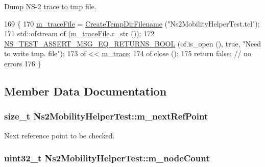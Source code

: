 Dump N\+S-\/2 trace to tmp file. 


\begin{DoxyCode}
169   \{
170     \hyperlink{classNs2MobilityHelperTest_a1bc1788ddcd0eb7ecf3e7d254afcd453}{m\_traceFile} = \hyperlink{classns3_1_1TestCase_a8a04695a6fb9ba0f89e28e9523963f88}{CreateTempDirFilename} (\textcolor{stringliteral}{"Ns2MobilityHelperTest.tcl"});
171     std::ofstream of (\hyperlink{classNs2MobilityHelperTest_a1bc1788ddcd0eb7ecf3e7d254afcd453}{m\_traceFile}.c\_str ());
172     \hyperlink{group__testing_ga5649dddde97a42ddfd4cd88aa53b37c6}{NS\_TEST\_ASSERT\_MSG\_EQ\_RETURNS\_BOOL} (of.is\_open (), \textcolor{keyword}{true}, \textcolor{stringliteral}{"Need to
       write tmp. file"});
173     of << \hyperlink{classNs2MobilityHelperTest_a50e34459c6cde5f834f874284687f71a}{m\_trace};
174     of.close ();
175     \textcolor{keywordflow}{return} \textcolor{keyword}{false}; \textcolor{comment}{// no errors}
176   \}
\end{DoxyCode}


\subsection{Member Data Documentation}
\subsubsection[{\texorpdfstring{m\+\_\+next\+Ref\+Point}{m_nextRefPoint}}]{\setlength{\rightskip}{0pt plus 5cm}size\+\_\+t Ns2\+Mobility\+Helper\+Test\+::m\+\_\+next\+Ref\+Point\hspace{0.3cm}{\ttfamily [private]}}\hypertarget{classNs2MobilityHelperTest_a5de4e64d6aa254ea6015cc6deb6e0de4}{}\label{classNs2MobilityHelperTest_a5de4e64d6aa254ea6015cc6deb6e0de4}


Next reference point to be checked. 

\subsubsection[{\texorpdfstring{m\+\_\+node\+Count}{m_nodeCount}}]{\setlength{\rightskip}{0pt plus 5cm}uint32\+\_\+t Ns2\+Mobility\+Helper\+Test\+::m\+\_\+node\+Count\hspace{0.3cm}{\ttfamily [private]}}\hypertarget{classNs2MobilityHelperTest_ac9a12b3a0ed8021cabe9842ba39a8b0e}{}\label{classNs2MobilityHelperTest_ac9a12b3a0ed8021cabe9842ba39a8b0e}


